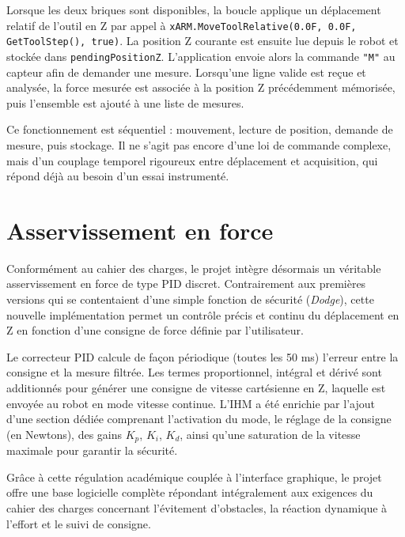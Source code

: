 \documentclass[11pt,a4paper]{article}
\begin{document}
Lorsque les deux briques sont disponibles, la boucle applique un d\'eplacement relatif de l'outil en Z par appel \`a \texttt{xARM.MoveToolRelative(0.0F, 0.0F, GetToolStep(), true)}. La position Z courante est ensuite lue depuis le robot et stock\'ee dans \texttt{pendingPositionZ}. L'application envoie alors la commande \texttt{"M"} au capteur afin de demander une mesure. Lorsqu'une ligne valide est re\c{c}ue et analys\'ee, la force mesur\'ee est associ\'ee \`a la position Z pr\'ec\'edemment m\'emoris\'ee, puis l'ensemble est ajout\'e \`a une liste de mesures.

Ce fonctionnement est s\'equentiel : mouvement, lecture de position, demande de mesure, puis stockage. Il ne s'agit pas encore d'une loi de commande complexe, mais d'un couplage temporel rigoureux entre d\'eplacement et acquisition, qui r\'epond d\'ej\`a au besoin d'un essai instrument\'e.

\section{Asservissement en force}
\label{sec:asservissement}
Conform\'ement au cahier des charges, le projet int\`egre d\'esormais un v\'eritable asservissement en force de type PID discret. Contrairement aux premi\`eres versions qui se contentaient d'une simple fonction de s\'ecurit\'e (\emph{Dodge}), cette nouvelle impl\'ementation permet un contr\^ole pr\'ecis et continu du d\'eplacement en Z en fonction d'une consigne de force d\'efinie par l'utilisateur.

Le correcteur PID calcule de fa\c{c}on p\'eriodique (toutes les 50 ms) l'erreur entre la consigne et la mesure filtr\'ee. Les termes proportionnel, int\'egral et d\'eriv\'e sont additionn\'es pour g\'en\'erer une consigne de vitesse cart\'esienne en Z, laquelle est envoy\'ee au robot en mode vitesse continue. L'IHM a \'et\'e enrichie par l'ajout d'une section d\'edi\'ee comprenant l'activation du mode, le r\'eglage de la consigne (en Newtons), des gains $K_p$, $K_i$, $K_d$, ainsi qu'une saturation de la vitesse maximale pour garantir la s\'ecurit\'e.

Gr\^ace \`a cette r\'egulation acad\'emique coupl\'ee \`a l'interface graphique, le projet offre une base logicielle compl\`ete r\'epondant int\'egralement aux exigences du cahier des charges concernant l'\'evitement d'obstacles, la r\'eaction dynamique \`a l'effort et le suivi de consigne.
\end{document}

